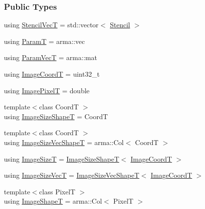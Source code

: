 \subsubsection*{Public Types}
\begin{DoxyCompactItemize}
\item 
using \hyperlink{classmappel_1_1Gauss1DModel_a442a5cb4b21cbb2f5187f327e5c01124}{Stencil\+VecT} = std\+::vector$<$ \hyperlink{classmappel_1_1Gauss1DModel_1_1Stencil}{Stencil} $>$
\item 
using \hyperlink{classmappel_1_1PointEmitterModel_a665ec6aea3aac139bb69a23c06d4b9a1}{ParamT} = arma\+::vec
\item 
using \hyperlink{classmappel_1_1PointEmitterModel_add253b568d763f1513a810aac35de719}{Param\+VecT} = arma\+::mat
\item 
using \hyperlink{classmappel_1_1ImageFormat1DBase_a82ab3168eb1a87eaeb3e7c919188e9fc}{Image\+CoordT} = uint32\+\_\+t
\item 
using \hyperlink{classmappel_1_1ImageFormat1DBase_a156fe500fd249cb4b77bdb0abc0dd0ea}{Image\+PixelT} = double
\item 
{\footnotesize template$<$class CoordT $>$ }\\using \hyperlink{classmappel_1_1ImageFormat1DBase_ab722bbd223963861691ef038721b6e02}{Image\+Size\+ShapeT} = CoordT
\item 
{\footnotesize template$<$class CoordT $>$ }\\using \hyperlink{classmappel_1_1ImageFormat1DBase_a3c584ee68fa44dc10de2edbc3d9882bb}{Image\+Size\+Vec\+ShapeT} = arma\+::\+Col$<$ CoordT $>$
\item 
using \hyperlink{classmappel_1_1ImageFormat1DBase_a6456bab2b26702022ee32ae19e90dcac}{Image\+SizeT} = \hyperlink{classmappel_1_1ImageFormat1DBase_ab722bbd223963861691ef038721b6e02}{Image\+Size\+ShapeT}$<$ \hyperlink{classmappel_1_1ImageFormat1DBase_a82ab3168eb1a87eaeb3e7c919188e9fc}{Image\+CoordT} $>$
\item 
using \hyperlink{classmappel_1_1ImageFormat1DBase_a5114a360a9bfcc4b5bc498c4600452f7}{Image\+Size\+VecT} = \hyperlink{classmappel_1_1ImageFormat1DBase_a3c584ee68fa44dc10de2edbc3d9882bb}{Image\+Size\+Vec\+ShapeT}$<$ \hyperlink{classmappel_1_1ImageFormat1DBase_a82ab3168eb1a87eaeb3e7c919188e9fc}{Image\+CoordT} $>$
\item 
{\footnotesize template$<$class PixelT $>$ }\\using \hyperlink{classmappel_1_1ImageFormat1DBase_a20d315459b83c348b1465614699783b3}{Image\+ShapeT} = arma\+::\+Col$<$ PixelT $>$

\end{DoxyCompactItemize}
